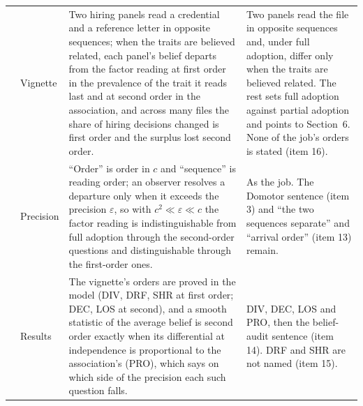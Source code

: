 \documentclass[11pt,a4paper]{article}
\begin{document}
\begin{longtable}{@{}p{0.7cm}p{1.6cm}p{6.5cm}p{6.5cm}@{}}
\addlinespace
4 & Vignette & Two hiring panels read a credential and a reference letter in opposite sequences; when the traits are believed related, each panel's belief departs from the factor reading at first order in the prevalence of the trait it reads last and at second order in the association, and across many files the share of hiring decisions changed is first order and the surplus lost second order.
  & Two panels read the file in opposite sequences and, under full adoption, differ only when the traits are believed related. The rest sets full adoption against partial adoption and points to Section~6. None of the job's orders is stated (item 16).\\
\addlinespace
5 & Precision & ``Order'' is order in $c$ and ``sequence'' is reading order; an observer resolves a departure only when it exceeds the precision $\varepsilon$, so with $c^{2}\ll\varepsilon\ll c$ the factor reading is indistinguishable from full adoption through the second-order questions and distinguishable through the first-order ones.
  & As the job. The Domotor sentence (item 3) and ``the two sequences separate'' and ``arrival order'' (item 13) remain.\\
\addlinespace
6 & Results & The vignette's orders are proved in the model (DIV, DRF, SHR at first order; DEC, LOS at second), and a smooth statistic of the average belief is second order exactly when its differential at independence is proportional to the association's (PRO), which says on which side of the precision each such question falls.
  & DIV, DEC, LOS and PRO, then the belief-audit sentence (item 14). DRF and SHR are not named (item 15).\\
\end{longtable}
\end{document}
